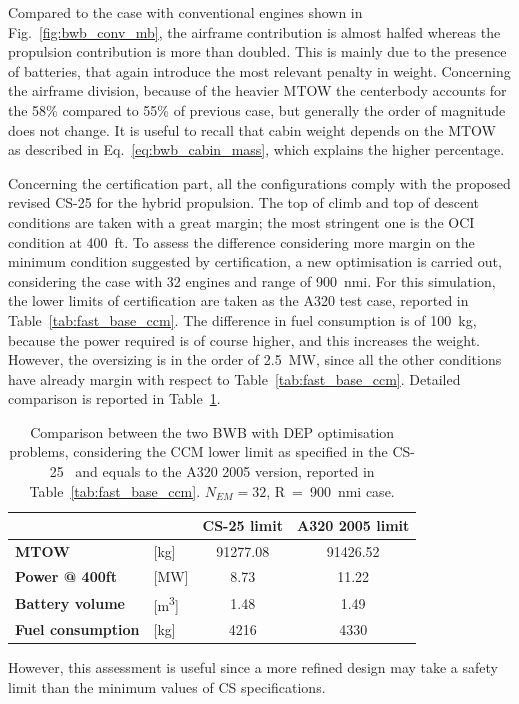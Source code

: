 Compared to the case with conventional engines shown in Fig.~\ref{fig:bwb_conv_mb}, the airframe contribution is almost halfed whereas the propulsion contribution is more than doubled. 
This is mainly due to the presence of batteries, that again introduce the most relevant penalty in weight. 
Concerning the airframe division, because of the heavier MTOW the centerbody accounts for the 58\% compared to 55\% of previous case, but generally the order of magnitude does not change. 
It is useful to recall that cabin weight depends on the MTOW as described in Eq.~\eqref{eq:bwb_cabin_mass}, which explains the higher percentage. 

Concerning the certification part, all the configurations comply with the proposed revised CS-25 for the hybrid propulsion. 
The top of climb and top of descent conditions are taken with a great margin; the most stringent one is the OCI condition at 400~ft. 
To assess the difference considering more margin on the minimum condition suggested by certification, a new optimisation is carried out, considering the case with 32 engines and range of 900~nmi. 
For this simulation, the lower limits of certification are taken as the A320 test case, reported in Table~\ref{tab:fast_base_ccm}. 
The difference in fuel consumption is of 100~\si{\kilogram}, because the power required is of course higher, and this increases the weight. 
However, the oversizing is in the order of 2.5~\si{\mega\watt}, since all the other conditions have already margin with respect to Table~\ref{tab:fast_base_ccm}.
Detailed comparison is reported in Table~\ref{tab:bwb_hybrid_dep_optim_ccm_comp}. 
\begin{table}[!h]
	\centering 
	\begin{tabular}{l l c c}
		\cline{3-4}
		& & \textbf{CS-25 limit} & \textbf{A320 2005 limit} \\
		\hline
		\textbf{MTOW} & [\si{\kilogram}] & 91277.08 & 91426.52 \\
		\textbf{Power @ 400ft} & [\si{\mega\watt}] & 8.73 & 11.22 \\
		\textbf{Battery volume} & [\si{\cubic\meter}] & 1.48 & 1.49 \\
		\textbf{Fuel consumption} & [\si{\kilogram}] & 4216 & 4330 \\
		\hline
	\end{tabular}
	\caption{Comparison between the two BWB with DEP optimisation problems, considering the CCM lower limit as specified in the CS-25~\cite{bib:cs25} and equals to the A320 2005 version, reported in Table~\ref{tab:fast_base_ccm}. $N_{EM}=32$, R~=~900~nmi case.}
	\label{tab:bwb_hybrid_dep_optim_ccm_comp}
\end{table} 
However, this assessment is useful since a more refined design may take a safety limit than the minimum values of CS specifications. 


